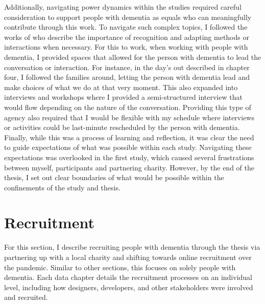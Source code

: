 Additionally, navigating power dynamics within the studies required careful consideration to support people with dementia as equals who can meaningfully contribute through this work. To navigate such complex topics, I followed the works of \cite{foley_struggle_2019,morrissey_value_2017, lazar_critical_2017} who describe the importance of recognition and adapting methods or interactions when necessary. For this to work, when working with people with dementia, I provided spaces that allowed for the person with dementia to lead the conversation or interaction. For instance, in the day's out described in chapter four, I followed the families around, letting the person with dementia lead and make choices of what we do at that very moment. This also expanded into interviews and workshops where I provided a semi-structured interview that would flow depending on the nature of the conversation. Providing this type of agency also required that I would be flexible with my schedule where interviews or activities could be last-minute rescheduled by the person with dementia. Finally, while this was a process of learning and reflection, it was clear the need to guide expectations of what was possible within each study. Navigating these expectations was overlooked in the first study, which caused several frustrations between myself, participants and partnering charity. However, by the end of the thesis, I set out clear boundaries of what would be possible within the confinements of the study and thesis.

\section{Recruitment}
\label{Method:Recruitment}
For this section, I describe recruiting people with dementia through the thesis via partnering up with a local charity and shifting towards online recruitment over the pandemic. Similar to other sections, this focuses on solely people with dementia. Each data chapter details the recruitment processes on an individual level, including how designers, developers, and other stakeholders were involved and recruited.


